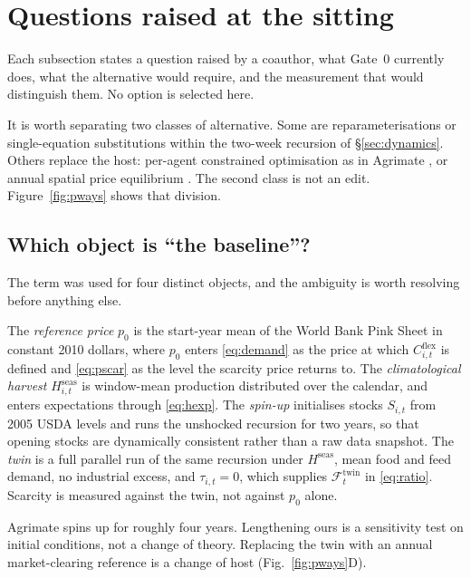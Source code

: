 \section{Questions raised at the sitting}
\label{sec:options}

Each subsection states a question raised by a coauthor, what Gate~0
currently does, what the alternative would require, and the measurement
that would distinguish them. No option is selected here.

It is worth separating two classes of alternative. Some are
reparameterisations or single-equation substitutions within the two-week
recursion of \S\ref{sec:dynamics}. Others replace the host: per-agent
constrained optimisation as in Agrimate \citep{kuhla2025}, or annual
spatial price equilibrium \citep{samuelson1952,takayama1971}. The second
class is not an edit. Figure~\ref{fig:pways} shows that division.

\subsection{Which object is ``the baseline''?}

The term was used for four distinct objects, and the ambiguity is worth
resolving before anything else.

The \emph{reference price} \(p_0\) is the start-year mean of the World
Bank Pink Sheet in constant 2010 dollars, where \(p_0\) enters
\eqref{eq:demand} as the price at which \(C^{\mathrm{flex}}_{i,t}\) is
defined and \eqref{eq:pscar} as the level the scarcity price returns to.
The \emph{climatological harvest} \(H^{\mathrm{seas}}_{i,t}\) is
window-mean production distributed over the calendar, and enters
expectations through \eqref{eq:hexp}. The \emph{spin-up} initialises
stocks \(S_{i,t}\) from 2005 USDA levels and runs the unshocked recursion
for two years, so that opening stocks are dynamically consistent rather
than a raw data snapshot. The \emph{twin} is a full parallel run of the
same recursion under \(H^{\mathrm{seas}}\), mean food and feed demand, no
industrial excess, and \(\tau_{i,t}=0\), which supplies
\(\mathcal{F}^{\mathrm{twin}}_t\) in \eqref{eq:ratio}. Scarcity is measured
against the twin, not against \(p_0\) alone.

Agrimate spins up for roughly four years. Lengthening ours is a
sensitivity test on initial conditions, not a change of theory. Replacing
the twin with an annual market-clearing reference is a change of host
(Fig.~\ref{fig:pways}D).

